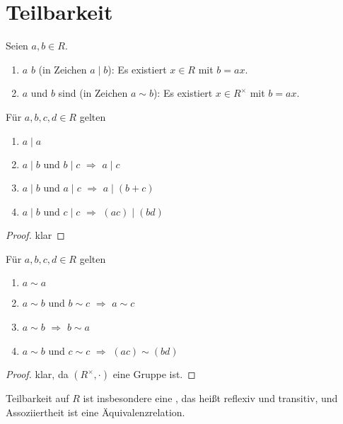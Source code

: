 \section{Teilbarkeit}

\begin{definition}[Teilbarkeit]
	Seien $a,b\in R$.
	\begin{enumerate}
		\item $a$  $b$ (in Zeichen $a\mid b$): Es existiert $x\in R$ mit $b=ax$.
		\item $a$ und $b$ sind  (in Zeichen $a\sim b$): Es existiert $x\in R^{\times}$ mit $b=ax$.
	\end{enumerate}
\end{definition}

\begin{lemma}
	Für $a,b,c,d\in R$ gelten
	\begin{enumerate}
		\item $a\mid a$
		\item $a\mid b$ und $b\mid c$ $\Rightarrow$ $a\mid c$
		\item $a\mid b$ und $a\mid c$ $\Rightarrow$ $a\mid (b+c)$
		\item $a\mid b$ und $c\mid c$ $\Rightarrow$ $(ac)\mid (bd)$
	\end{enumerate}
\end{lemma}
\begin{proof}
	klar
\end{proof}

\begin{lemma}
	Für $a,b,c,d\in R$ gelten
	\begin{enumerate}
		\item $a\sim a$
		\item $a\sim b$ und $b\sim c$ $\Rightarrow$ $a\sim c$
		\item $a\sim b$ $\Rightarrow$ $b\sim a$
		\item $a\sim b$ und $c\sim c$ $\Rightarrow$ $(ac)\sim (bd)$
	\end{enumerate}
\end{lemma}
\begin{proof}
	klar, da $(R^\times,\cdot)$ eine Gruppe ist.
\end{proof}

\begin{remark}
	Teilbarkeit auf $R$ ist insbesondere eine , das heißt reflexiv und transitiv, und Assoziiertheit ist eine Äquivalenzrelation.
\end{remark}

